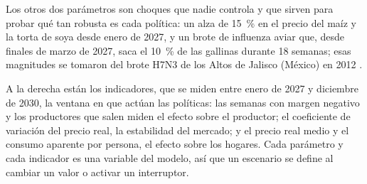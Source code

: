 \documentclass[preprint,12pt,authoryear]{elsarticle}
\begin{document}
Los otros dos parámetros son choques que nadie controla y que sirven para probar qué tan robusta es cada política: un alza de 15~\% en el precio del maíz y la torta de soya desde enero de 2027, y un brote de influenza aviar que, desde finales de marzo de 2027, saca el 10~\% de las gallinas durante 18 semanas; esas magnitudes se tomaron del brote H7N3 de los Altos de Jalisco (México) en 2012 \citep{SENASICA2022}.

A la derecha están los indicadores, que se miden entre enero de 2027 y diciembre de 2030, la ventana en que actúan las políticas: las semanas con margen negativo y los productores que salen miden el efecto sobre el productor; el coeficiente de variación del precio real, la estabilidad del mercado; y el precio real medio y el consumo aparente por persona, el efecto sobre los hogares. Cada parámetro y cada indicador es una variable del modelo, así que un escenario se define al cambiar un valor o activar un interruptor.
\end{document}
